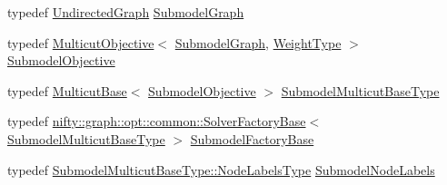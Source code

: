 \begin{DoxyCompactItemize}
typedef \hyperlink{classnifty_1_1graph_1_1UndirectedGraph}{Undirected\+Graph} \hyperlink{classnifty_1_1graph_1_1opt_1_1multicut_1_1MulticutDecomposer_a0b5a0c20681704250c2762b807a9789b}{Submodel\+Graph}
\item 
typedef \hyperlink{classnifty_1_1graph_1_1opt_1_1multicut_1_1MulticutObjective}{Multicut\+Objective}$<$ \hyperlink{classnifty_1_1graph_1_1opt_1_1multicut_1_1MulticutDecomposer_a0b5a0c20681704250c2762b807a9789b}{Submodel\+Graph}, \hyperlink{classnifty_1_1graph_1_1opt_1_1multicut_1_1MulticutDecomposer_a9507b924e75719283340e9ddbf830b27}{Weight\+Type} $>$ \hyperlink{classnifty_1_1graph_1_1opt_1_1multicut_1_1MulticutDecomposer_ab351e744b74ac435c3b76100af264689}{Submodel\+Objective}
\item 
typedef \hyperlink{classnifty_1_1graph_1_1opt_1_1multicut_1_1MulticutBase}{Multicut\+Base}$<$ \hyperlink{classnifty_1_1graph_1_1opt_1_1multicut_1_1MulticutDecomposer_ab351e744b74ac435c3b76100af264689}{Submodel\+Objective} $>$ \hyperlink{classnifty_1_1graph_1_1opt_1_1multicut_1_1MulticutDecomposer_a6323facd0866e8847a555dc975c6daf8}{Submodel\+Multicut\+Base\+Type}
\item 
typedef \hyperlink{classnifty_1_1graph_1_1opt_1_1common_1_1SolverFactoryBase}{nifty\+::graph\+::opt\+::common\+::\+Solver\+Factory\+Base}$<$ \hyperlink{classnifty_1_1graph_1_1opt_1_1multicut_1_1MulticutDecomposer_a6323facd0866e8847a555dc975c6daf8}{Submodel\+Multicut\+Base\+Type} $>$ \hyperlink{classnifty_1_1graph_1_1opt_1_1multicut_1_1MulticutDecomposer_a7b25dc946b8d2e57e76ab54bca655f63}{Submodel\+Factory\+Base}
\item 
typedef \hyperlink{classnifty_1_1graph_1_1opt_1_1common_1_1SolverBase_abefd51561de2fd009f6bed6bef6009ea}{Submodel\+Multicut\+Base\+Type\+::\+Node\+Labels\+Type} \hyperlink{classnifty_1_1graph_1_1opt_1_1multicut_1_1MulticutDecomposer_a301b3a8735730568487456d913c1b407}{Submodel\+Node\+Labels}
\end{DoxyCompactItemize}
